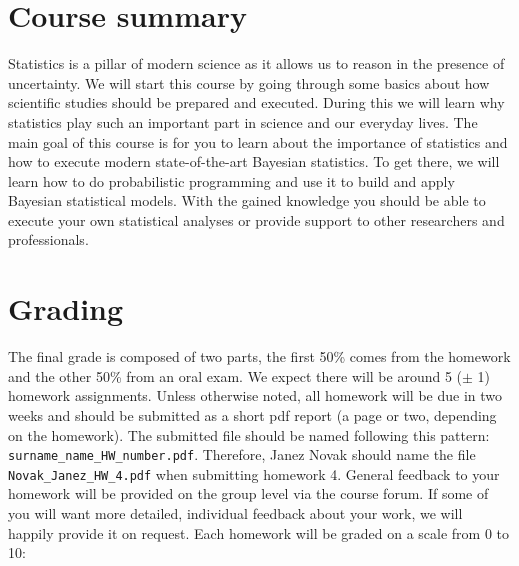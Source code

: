 \documentclass[fleqn,moreauthors,10pt]{ds_report}
\begin{document}
\flushbottom

\maketitle

\thispagestyle{empty}



\section*{Course summary}

Statistics is a pillar of modern science as it allows us to reason in the presence of uncertainty. We will start this course by going through some basics about how scientific studies should be prepared and executed. During this we will learn why statistics play such an important part in science and our everyday lives. The main goal of this course is for you to learn about the importance of statistics and how to execute modern state-of-the-art Bayesian statistics. To get there, we will learn how to do probabilistic programming and use it to build and apply Bayesian statistical models. With the gained knowledge you should be able to execute your own statistical analyses or provide support to other researchers and professionals.

\section*{Grading}

The final grade is composed of two parts, the first 50\% comes from the homework and the other 50\% from an oral exam. We expect there will be around 5 ($\pm$ 1) homework assignments. Unless otherwise noted, all homework will be due in two weeks and should be submitted as a short pdf report (a page or two, depending on the homework). The submitted file should be named following this pattern: \texttt{surname\_name\_HW\_number.pdf}. Therefore, Janez Novak should name the file \texttt{Novak\_Janez\_HW\_4.pdf} when submitting homework 4. General feedback to your homework will be provided on the group level via the course forum. If some of you will want more detailed, individual feedback about your work, we will happily provide it on request. Each homework will be graded on a scale from 0 to 10:
\end{document}
